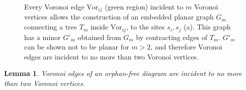 \documentclass[11pt]{article}
\newtheorem{lemma}{Lemma}
\newcommand{\Vor}{\text{Vor}}
\begin{document}
\begin{figure}[!h]
   \centering
	\quad\quad
   \caption{Every Voronoi edge $\Vor_{ij}$ (green region) incident to $m$ Voronoi vertices 
   			allows the construction of an embedded planar graph $G_m$ connecting 
   			a tree $T_m$ inside $\Vor_{ij}$, to the sites $s_i,s_j$ (a). 
		This graph has a minor $G'_m$ obtained from $G_m$ by contracting edges of $T_m$. 
		$G'_m$ can be shown not to be planar for $m>2$, and therefore Voronoi edges are incident to no more than two Voronoi vertices. 
		 }
   \label{fig:planarity}
\end{figure}



\begin{lemma}\label{lem:val_le2}
Voronoi edges of an orphan-free diagram are incident to no more than two Voronoi vertices.
\end{lemma}
\end{document}
